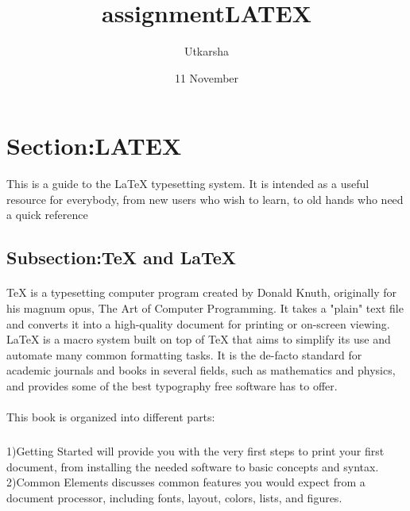 \documentclass{article}
\title{assignment}
\author{Utkarsha}
\title{LATEX}
\date{11 November}
\begin{document}
\tableofcontents
	\maketitle
	\color{blue}
	
	\section{Section:LATEX}
	This is a guide to the LaTeX typesetting system. It is intended as a useful resource for everybody, from new users who wish to learn, to old hands who need a quick reference
	
	\subsection{Subsection:TeX and LaTeX}
	\paragraph{}
	TeX is a typesetting computer program created by Donald Knuth, originally for his magnum opus, The Art of Computer Programming. It takes a "plain" text file and converts it into a high-quality document for printing or on-screen viewing. LaTeX is a macro system built on top of TeX that aims to simplify its use and automate many common formatting tasks. It is the de-facto standard for academic journals and books in several fields, such as mathematics and physics, and provides some of the best typography free software has to offer.
	
	\paragraph{}
	This book is organized into different parts:
	\subparagraph{}
	1)Getting Started will provide you with the very first steps to print your first document, from installing the needed software to basic concepts and syntax.
	2)Common Elements discusses common features you would expect from a document processor, including fonts, layout, colors, lists, and figures.
	
	
	
\end{document}
